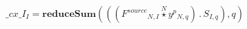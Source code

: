\documentclass[border=2pt]{standalone}
\begin{document}
${\_cx\_I}{_{I}}=\textbf{reduceSum}\left(\left(\left({{F^{source}}}{_{N, I}} \stackrel{N}{\star} {{y^{p}}}{_{N, q}}\right) \, . \, {{S}}{_{I, q}}\right),q\right)$
\end{document}
